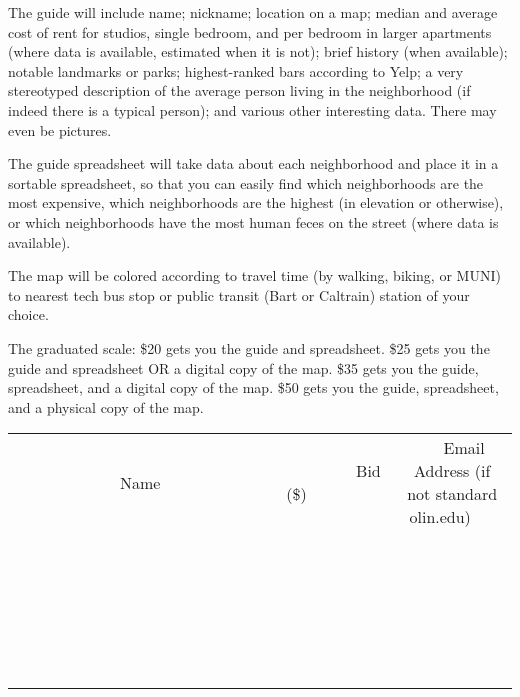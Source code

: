 \documentclass[11pt]{article}
\begin{document}
The guide will include name; nickname; location on a map; median and average cost of rent for studios, single bedroom, and per bedroom in larger apartments (where data is available, estimated when it is not); brief history (when available); notable landmarks or parks; highest-ranked bars according to Yelp; a very stereotyped description of the average person living in the neighborhood (if indeed there is a typical person); and various other interesting data. There may even be pictures.

The guide spreadsheet will take data about each neighborhood and place it in a sortable spreadsheet, so that you can easily find which neighborhoods are the most expensive, which neighborhoods are the highest (in elevation or otherwise), or which neighborhoods have the most human feces on the street (where data is available).

The map will be colored according to travel time (by walking, biking, or MUNI) to nearest tech bus stop or public transit (Bart or Caltrain) station of your choice. 

The graduated scale:
\$20 gets you the guide and spreadsheet.
\$25 gets you the guide and spreadsheet OR a digital copy of the map.
\$35 gets you the guide, spreadsheet, and a digital copy of the map.
\$50 gets you the guide, spreadsheet, and a physical copy of the map.
\\[6ex]
\begin{tabular}{c c c}
~~~~~~~~~~~~~Name~~~~~~~~~~~~~ & ~~~~~~~~~Bid (\$)~~~~~~~~~  & ~~~Email Address (if not standard olin.edu)~~~\\
 & & \\
\hline
 & & \\
\hline
 & & \\
\hline
 & & \\
\hline
 & & \\
\hline
 & & \\
\hline
 & & \\
\hline
 & & \\
\hline
 & & \\
\hline
 & & \\
\hline
 & & \\
\hline
 & & \\
\hline
 & & \\
\hline
 & & \\
\hline
 & & \\
\hline
 & & \\
\hline
 & & \\
\hline
 & & \\
\hline
 & & \\
\hline
 & & \\
\hline
 & & \\
\hline
 & & \\
\hline
 & & \\
\hline
 & & \\
\hline
 & & \\
\hline
 & & \\
\hline
\end{tabular}
\newpage
\end{document}
